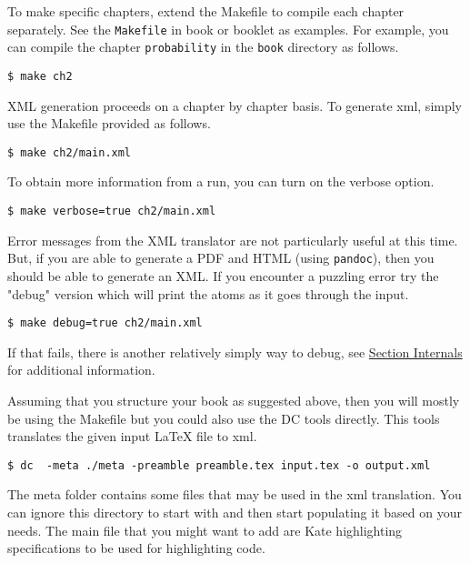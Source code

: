 \begin{gram}
To make specific chapters,  extend the Makefile to compile each chapter separately.  See the \lstinline`Makefile` in book or booklet as examples.
%
For example, you can compile the chapter \lstinline`probability` in the \lstinline`book` directory as follows.
\begin{lstlisting}
$ make ch2
\end{lstlisting}
\end{gram}


\begin{gram}
XML generation proceeds on a chapter by chapter basis.
%
To generate xml, simply use the Makefile provided as follows.
%
\begin{lstlisting}
$ make ch2/main.xml
\end{lstlisting}
%

To obtain more information from a run, you can turn on the verbose option.
%
\begin{lstlisting}
$ make verbose=true ch2/main.xml
\end{lstlisting}
\end{gram}

\begin{gram}
Error messages from the XML translator are not particularly useful at this time.  But, if you are able to generate a PDF and HTML (using \lstinline`pandoc`), then you should be able to generate an XML. 
%
If you encounter a puzzling error try the "debug" version which will print the atoms as it goes through the input.
%
\begin{lstlisting}
$ make debug=true ch2/main.xml
\end{lstlisting}

If that fails, there is another relatively simply way to debug, see \href{sec:dc::internals}{Section Internals} for additional information.
\end{gram}

\begin{gram}
Assuming that you structure your book as suggested above, then you will mostly be using the Makefile but you could also use the DC tools directly. 
%
This tools translates the given input LaTeX file to xml.

\begin{lstlisting}
$ dc  -meta ./meta -preamble preamble.tex input.tex -o output.xml
\end{lstlisting}

The meta folder contains some files that may be used in the xml translation.  You can ignore this directory to start with and then start populating it based on your needs.  The main file that you might want to add are Kate highlighting specifications to be used for highlighting code.
\end{gram}

